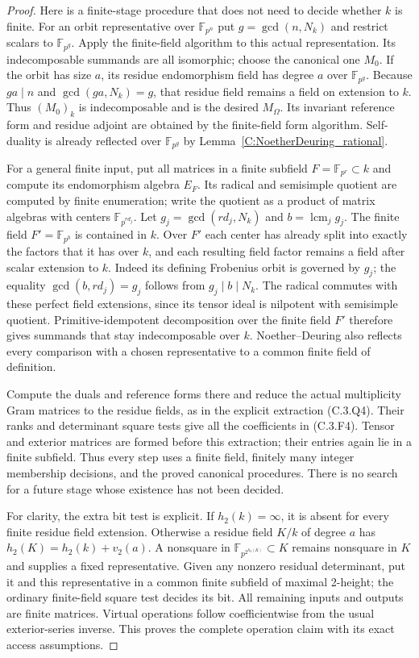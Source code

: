 \begin{proof}
Here is a finite-stage procedure that does not need to decide
whether $k$ is finite. For an orbit representative over
$\mathbb F_{p^n}$ put $g=\gcd(n,N_k)$ and restrict scalars to
$\mathbb F_{p^g}$. Apply the finite-field algorithm to this
actual representation. Its indecomposable summands are all
isomorphic; choose the canonical one $M_0$. If the orbit has
size $a$, its residue endomorphism field has degree $a$ over
$\mathbb F_{p^g}$. Because $ga\mid n$ and
$\gcd(ga,N_k)=g$, that residue field remains a field on
extension to $k$. Thus $(M_0)_k$ is indecomposable and is the
desired $M_\Omega$. Its invariant reference form and residue
adjoint are obtained by the finite-field form algorithm.
Self-duality is already reflected over $\mathbb F_{p^g}$ by
Lemma~\ref{C:NoetherDeuring_rational}.

For a general finite input, put all matrices in a finite subfield
$F=\mathbb F_{p^r}\subset k$ and compute its endomorphism
algebra $E_F$. Its radical and semisimple quotient are computed
by finite enumeration; write the quotient as a product of
matrix algebras with centers $\mathbb F_{p^{rd_j}}$.
Let $g_j=\gcd(rd_j,N_k)$ and
$b=\operatorname{lcm}_j g_j$. The finite field
$F'=\mathbb F_{p^b}$ is contained in $k$.
Over $F'$ each center has already split into exactly the
factors that it has over $k$, and each resulting field factor
remains a field after scalar extension to $k$.
Indeed its defining Frobenius orbit is governed by $g_j$;
the equality $\gcd(b,rd_j)=g_j$ follows from $g_j\mid b\mid N_k$.
The radical commutes with these perfect field extensions,
since its tensor ideal is nilpotent with semisimple quotient.
Primitive-idempotent decomposition over the finite field $F'$
therefore gives summands that stay indecomposable over $k$.
Noether--Deuring also reflects every comparison with a chosen
representative to a common finite field of definition.

Compute the duals and reference forms there and reduce the
actual multiplicity Gram matrices to the residue fields, as
in the explicit extraction (C.3.Q4). Their ranks and determinant
square tests give all the coefficients in (C.3.F4).
Tensor and exterior matrices are formed before this extraction;
their entries again lie in a finite subfield. Thus every step
uses a finite field, finitely many integer membership decisions,
and the proved canonical procedures. There is no search for a
future stage whose existence has not been decided.

For clarity, the extra bit test is explicit. If $h_2(k)=\infty$,
it is absent for every finite residue field extension. Otherwise
a residue field $K/k$ of degree $a$ has
$h_2(K)=h_2(k)+v_2(a)$. A nonsquare in
$\mathbb F_{p^{2^{h_2(K)}}}\subset K$ remains nonsquare in $K$
and supplies a fixed representative. Given any nonzero residual
determinant, put it and this representative in a common finite
subfield of maximal 2-height; the ordinary finite-field square
test decides its bit. All remaining inputs and outputs are finite
matrices. Virtual operations follow coefficientwise from the
usual exterior-series inverse. This proves the complete operation
claim with its exact access assumptions.
\end{proof}

